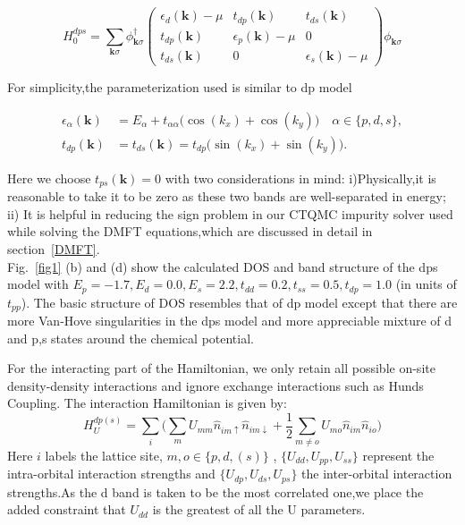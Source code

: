 \documentclass[10pt]{ruthesis}
\begin{document}
{ \begin{equation}
 H^{dps}_0=\sum_{\mathbf k \sigma}\phi^\dagger_{\mathbf k\sigma}
 \left(
 \begin{array}{ccc}
 \epsilon_d(\mathbf k)-\mu&t_{dp}(\mathbf k)&t_{ds}(\mathbf k)\\
t_{dp}(\mathbf k)&\epsilon_p(\mathbf k)-\mu&0\\
t_{ds}(\mathbf k)&0&\epsilon_s(\mathbf k)-\mu
 \end{array}
 \right)
 \phi_{\mathbf k\sigma}
 \end{equation}

 For simplicity,the parameterization used  is similar to dp model 

 \begin{align*}
 \epsilon_{\alpha}(\mathbf k) &=E_\alpha+t_{\alpha\alpha}\big(\cos(k_x)+\cos(k_y)\big)\quad \alpha\in\{p,d,s\},\\
 t_{dp}(\mathbf k) &=t_{ds}(\mathbf k)=t_{dp}\big(\sin(k_x)+\sin(k_y)\big).
 \end{align*}

 Here we choose $t_{ps}(\mathbf k)=0$ with two considerations in mind: i)Physically,it is reasonable to take it to be zero as these two bands are well-separated in energy; ii) It is helpful in reducing the sign problem in our CTQMC impurity solver used while solving the DMFT equations,which are discussed in detail in section~\ref{DMFT}.\\
 Fig.~\ref{fig1} (b) and (d) show the calculated DOS and band structure of the dps model with $E_p=-1.7,E_d=0.0,E_s=2.2,t_{dd}=0.2,t_{ss}=0.5,t_{dp}=1.0$ (in units of $t_{pp}$). The basic structure of DOS resembles that of dp model except that there are more Van-Hove singularities in the dps model and more appreciable mixture of d and p,s states around the chemical potential.


For the interacting part of the Hamiltonian, we only retain all possible on-site density-density interactions and ignore exchange interactions such as Hunds Coupling. The interaction Hamiltonian is given by:
 \begin{equation}\label{int}
 H^{dp(s)}_U=\sum_{i}\bigg(\sum_{m}U_{mm}\hat{n}_{im\uparrow}\hat{n}_{im\downarrow}+\frac{1}{2}\sum_{m\neq o}U_{mo}\hat{n}_{im}\hat{n}_{io}\bigg)
 \end{equation}
 Here $i$ labels the lattice site, $m,o\in\{p,d,(s)\}$ , $\{U_{dd},U_{pp},U_{ss}\}$ represent the intra-orbital interaction strengths and  $\{U_{dp},U_{ds},U_{ps}\}$ the inter-orbital interaction strengths.As the d band is taken to be the most correlated one,we place the added constraint that $U_{dd}$ is the greatest of all the U parameters.
 
}
\end{document}
